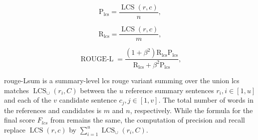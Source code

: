 \begin{equation}
\mathrm{P_{lcs}} = \frac{\operatorname{LCS}(r,c)}{n},
\label{eq:rouge_l_precision}
\end{equation}

\begin{equation}
\mathrm{R_{lcs}} = \frac{\operatorname{LCS}(r,c)}{m},
\label{eq:rouge_l_recall}
\end{equation}

\begin{equation}
\operatorname{ROUGE-L} = \frac{(1 + \beta^2)  \mathrm{R_{lcs}}  \mathrm{P_{lcs}}}{\mathrm{R_{lcs}} + \beta^2  \mathrm{P_{lcs}}},
\label{eq:rouge_l}
\end{equation}

\ac{rouge}-Lsum is a summary-level \ac{lcs} \ac{rouge} variant summing over the union \ac{lcs} matches $\operatorname{LCS}_\cup(r_i,C)$ between the $u$ reference summary sentences $r_i, i \in [1,u]$ and each of the $v$ candidate sentence $c_j, j \in [1,v]$.
The total number of words in the references and candidates is $m$ and $n$, respectively.
While the formula for the final score $F_{lcs}$ from  remains the same, the computation of precision and recall replace $\operatorname{LCS}(r,c)$ by $\sum_{i=1}^{u}\operatorname{LCS}_\cup(r_i,C)$.
